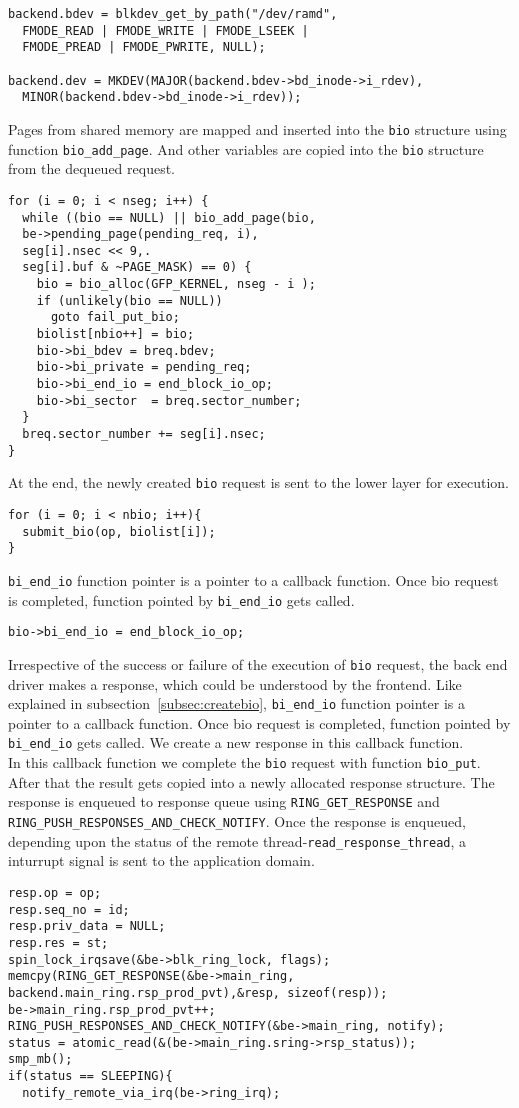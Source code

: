 \begin{verbatim}
backend.bdev = blkdev_get_by_path("/dev/ramd",
  FMODE_READ | FMODE_WRITE | FMODE_LSEEK |
  FMODE_PREAD | FMODE_PWRITE, NULL);

backend.dev = MKDEV(MAJOR(backend.bdev->bd_inode->i_rdev),
  MINOR(backend.bdev->bd_inode->i_rdev));
\end{verbatim}
Pages from shared memory are mapped and inserted into the \texttt{bio} structure using function \texttt{bio\_add\_page}. And other variables are copied into the \texttt{bio} structure from the dequeued request. 
\begin{verbatim}
for (i = 0; i < nseg; i++) {
  while ((bio == NULL) || bio_add_page(bio,
  be->pending_page(pending_req, i),
  seg[i].nsec << 9,.
  seg[i].buf & ~PAGE_MASK) == 0) {
    bio = bio_alloc(GFP_KERNEL, nseg - i );
    if (unlikely(bio == NULL))
      goto fail_put_bio;
    biolist[nbio++] = bio;  
    bio->bi_bdev = breq.bdev;
    bio->bi_private = pending_req;
    bio->bi_end_io = end_block_io_op;
    bio->bi_sector  = breq.sector_number;
  }
  breq.sector_number += seg[i].nsec;
}
\end{verbatim}
At the end, the newly created \texttt{bio} request is sent to the lower layer for execution. 
\begin{verbatim}
for (i = 0; i < nbio; i++){
  submit_bio(op, biolist[i]);
}
\end{verbatim}
\texttt{bi\_end\_io} function pointer is a pointer to a callback function. Once bio request is completed, function pointed by \texttt{bi\_end\_io} gets called.
\begin{verbatim}
bio->bi_end_io = end_block_io_op; 
\end{verbatim}

Irrespective of the success or failure of the execution of \texttt{bio} request, the back end driver makes a response, which could be understood by the frontend. Like explained in subsection~\ref{subsec:createbio}, \texttt{bi\_end\_io} function pointer is a pointer to a callback function. Once bio request is completed, function pointed by \texttt{bi\_end\_io} gets called. We create a new response in this callback function.
\\
In this callback function we complete the \texttt{bio} request with function \texttt{bio\_put}. After that the result gets copied into a newly allocated response structure. The response is enqueued to response queue using \texttt{RING\_GET\_RESPONSE} and \texttt{RING\_PUSH\_RESPONSES\_AND\_CHECK\_NOTIFY}. Once the response is enqueued, depending upon the status of the remote thread-\texttt{read\_response\_thread}, a inturrupt signal is sent to the application domain.
\begin{verbatim}
resp.op = op;
resp.seq_no = id;
resp.priv_data = NULL;
resp.res = st;
spin_lock_irqsave(&be->blk_ring_lock, flags);
memcpy(RING_GET_RESPONSE(&be->main_ring, backend.main_ring.rsp_prod_pvt),&resp, sizeof(resp));
be->main_ring.rsp_prod_pvt++;
RING_PUSH_RESPONSES_AND_CHECK_NOTIFY(&be->main_ring, notify);
status = atomic_read(&(be->main_ring.sring->rsp_status));
smp_mb();
if(status == SLEEPING){
  notify_remote_via_irq(be->ring_irq);
\end{verbatim}    

\pagebreak

% 
